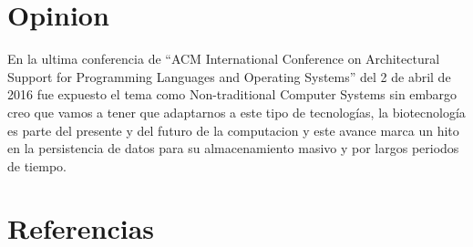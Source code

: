 \documentclass[12pt,letterpaper]{article}
\begin{document}
\section{Opinion}
En la ultima conferencia de \enquote{ACM \autocite{web:1} International Conference on Architectural Support for Programming Languages and Operating Systems} del 2 de abril de 2016\autocite{web:2} fue expuesto el tema como Non-traditional Computer Systems sin embargo creo que vamos a tener que adaptarnos a este tipo de tecnologías, la biotecnología es parte del presente y del futuro de la computacion y este avance marca un hito en la persistencia de datos para su almacenamiento masivo y por largos periodos de tiempo.

\section{Referencias\label{sec:references}}

\printbibliography[heading=none]
\end{document}
